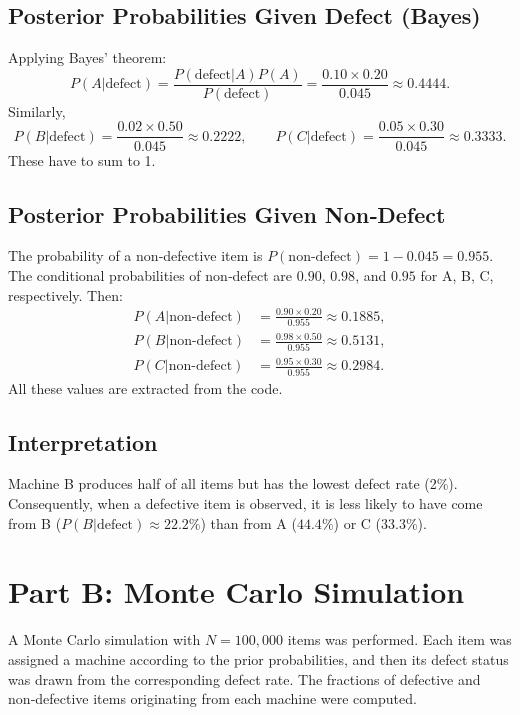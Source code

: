 \documentclass[11pt]{article}
\begin{document}
	\subsection{Posterior Probabilities Given Defect (Bayes)}
	Applying Bayes' theorem:
	\[
	P(A|\text{defect}) = \frac{P(\text{defect}|A)P(A)}{P(\text{defect})} = \frac{0.10\times0.20}{0.045} \approx 0.4444.
	\]
	Similarly,
	\[
	P(B|\text{defect}) = \frac{0.02\times0.50}{0.045} \approx 0.2222,\qquad
	P(C|\text{defect}) = \frac{0.05\times0.30}{0.045} \approx 0.3333.
	\]
	These have to sum to 1.
	
	\subsection{Posterior Probabilities Given Non‑Defect}
	The probability of a non‑defective item is \(P(\text{non‑defect})=1-0.045=0.955\). The conditional probabilities of non‑defect are \(0.90\), \(0.98\), and \(0.95\) for A, B, C, respectively. Then:
	\begin{align*}
		P(A|\text{non‑defect}) &= \frac{0.90\times0.20}{0.955} \approx 0.1885,\\
		P(B|\text{non‑defect}) &= \frac{0.98\times0.50}{0.955} \approx 0.5131,\\
		P(C|\text{non‑defect}) &= \frac{0.95\times0.30}{0.955} \approx 0.2984.
	\end{align*}
	All these values are extracted from the code.
	
	\subsection{Interpretation}
	Machine B produces half of all items but has the lowest defect rate (2\%). Consequently, when a defective item is observed, it is less likely to have come from B (\(P(B|\text{defect})\approx 22.2\%\)) than from A (\(44.4\%\)) or C (\(33.3\%\)).
	
	\section{Part B: Monte Carlo Simulation}
	A Monte Carlo simulation with \(N=100{,}000\) items was performed. Each item was assigned a machine according to the prior probabilities, and then its defect status was drawn from the corresponding defect rate. The fractions of defective and non‑defective items originating from each machine were computed.
	
\end{document}
